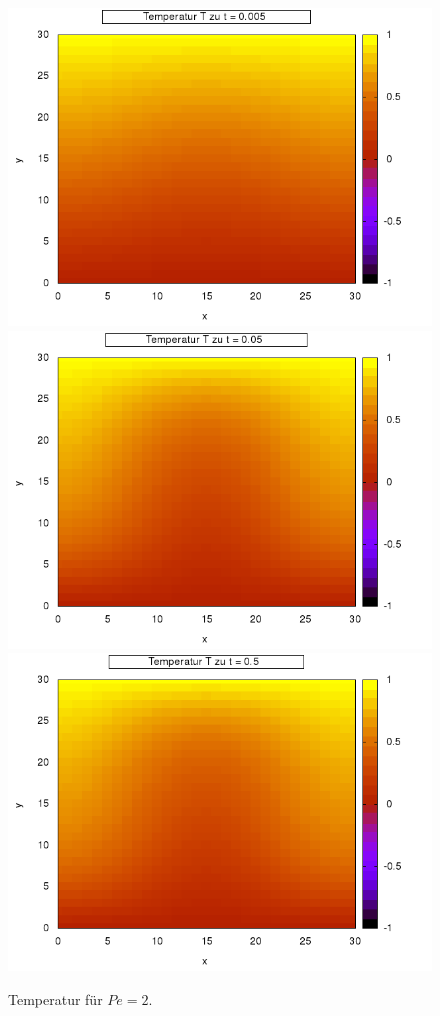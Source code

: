 \documentclass[12pt,a4paper,titlepage,headinclude,bibtotoc]{scrartcl}
\begin{document}
\noindent\begin{minipage}[t]{0.50\textwidth}%
\begin{figure}[H]  
   \includegraphics[width=\linewidth]{res/task4/2_0005.png}
   \includegraphics[width=\linewidth]{res/task4/2_005.png}
   \includegraphics[width=\linewidth]{res/task4/2_05.png}
   \caption{Temperatur für $Pe = 2$.}
   \label{fig:task4_2}
   \end{figure}
\end{minipage}%
\end{document}
